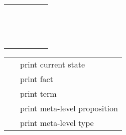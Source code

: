 \begin{isabellebody}
\begin{isamarkuptext}
\begin{tabular}{rcl}
    \hyperlink{command.obtain}{\mbox{\isa{\isacommand{obtain}}}}~\isa{{\isaliteral{22}{\isachardoublequote}}x\ {\isaliteral{5C3C57484552453E}{\isasymWHERE}}\ a{\isaliteral{3A}{\isacharcolon}}\ {\isaliteral{5C3C7068693E}{\isasymphi}}{\isaliteral{22}{\isachardoublequote}}} & \isa{{\isaliteral{22}{\isachardoublequote}}{\isaliteral{5C3C617070726F783E}{\isasymapprox}}{\isaliteral{22}{\isachardoublequote}}} &
      \isa{{\isaliteral{22}{\isachardoublequote}}{\isaliteral{5C3C646F74733E}{\isasymdots}}{\isaliteral{22}{\isachardoublequote}}}~\hyperlink{command.fix}{\mbox{\isa{\isacommand{fix}}}}~\isa{x}~\hyperlink{command.assume}{\mbox{\isa{\isacommand{assume}}}}~\isa{{\isaliteral{22}{\isachardoublequote}}a{\isaliteral{3A}{\isacharcolon}}\ {\isaliteral{5C3C7068693E}{\isasymphi}}{\isaliteral{22}{\isachardoublequote}}} \\
    \hyperlink{command.case}{\mbox{\isa{\isacommand{case}}}}~\isa{c} & \isa{{\isaliteral{22}{\isachardoublequote}}{\isaliteral{5C3C617070726F783E}{\isasymapprox}}{\isaliteral{22}{\isachardoublequote}}} &
      \hyperlink{command.fix}{\mbox{\isa{\isacommand{fix}}}}~\isa{x}~\hyperlink{command.assume}{\mbox{\isa{\isacommand{assume}}}}~\isa{{\isaliteral{22}{\isachardoublequote}}c{\isaliteral{3A}{\isacharcolon}}\ {\isaliteral{5C3C7068693E}{\isasymphi}}{\isaliteral{22}{\isachardoublequote}}} \\
    \hyperlink{command.sorry}{\mbox{\isa{\isacommand{sorry}}}} & \isa{{\isaliteral{22}{\isachardoublequote}}{\isaliteral{5C3C617070726F783E}{\isasymapprox}}{\isaliteral{22}{\isachardoublequote}}} &
      \hyperlink{command.by}{\mbox{\isa{\isacommand{by}}}}~\isa{cheating} \\
  \end{tabular}%
\end{isamarkuptext}%
\isamarkuptrue%
%
\isamarkuptrue%
%
\begin{isamarkuptext}%
\begin{tabular}{ll}
    \hyperlink{command.pr}{\mbox{\isa{\isacommand{pr}}}} & print current state \\
    \hyperlink{command.thm}{\mbox{\isa{\isacommand{thm}}}}~\isa{a} & print fact \\
    \hyperlink{command.term}{\mbox{\isa{\isacommand{term}}}}~\isa{t} & print term \\
    \hyperlink{command.prop}{\mbox{\isa{\isacommand{prop}}}}~\isa{{\isaliteral{5C3C7068693E}{\isasymphi}}} & print meta-level proposition \\
    \hyperlink{command.typ}{\mbox{\isa{\isacommand{typ}}}}~\isa{{\isaliteral{5C3C7461753E}{\isasymtau}}} & print meta-level type \\

\end{tabular}
\end{isamarkuptext}
\end{isabellebody}
